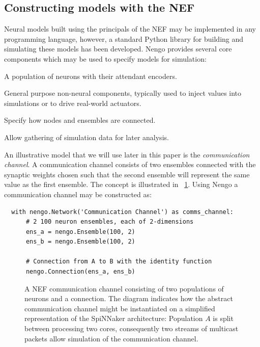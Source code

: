 \documentclass[conference]{IEEEtran}
\begin{document}
  \subsection{Constructing models with the NEF}
\label{sef:background/constructing}
Neural models built using the principals of the NEF may be implemented in any programming language, however, a standard Python library for building and simulating these models has been developed. Nengo \parencite{Bekolay2014} provides several core components which may be used to specify models for simulation:

  \begin{description}
    \item[Ensembles] A population of neurons with their attendant encoders.
    \item[Nodes] General purpose non-neural components, typically used to inject values into simulations or to drive real-world actuators.
    \item[Connections] Specify how nodes and ensembles are connected.
    \item[Probes] Allow gathering of simulation data for later analysis.
  \end{description}

  An illustrative model that we will use later in this paper is the \textit{communication channel}. A communication channel consists of two ensembles connected with the synaptic weights chosen such that the second ensemble will represent the same value as the first ensemble. The concept is illustrated in \figurename~\ref{fig:background/comms-channel}. Using Nengo a communication channel may be constructed as:

  \begin{lstlisting}
  with nengo.Network('Communication Channel') as comms_channel:
      # 2 100 neuron ensembles, each of 2-dimensions
      ens_a = nengo.Ensemble(100, 2)
      ens_b = nengo.Ensemble(100, 2)

      # Connection from A to B with the identity function
      nengo.Connection(ens_a, ens_b)
  \end{lstlisting}

  \begin{figure}
    \centering
    
    \caption{A NEF communication channel consisting of two populations of neurons and a connection.
    The diagram indicates how the abstract communication channel might be instantiated on a simplified representation of the SpiNNaker architecture:
    Population $A$ is split between processing two cores, consequently two streams of multicast packets allow simulation of the communication channel.
    }
    \label{fig:background/comms-channel}
  \end{figure}
\end{document}
